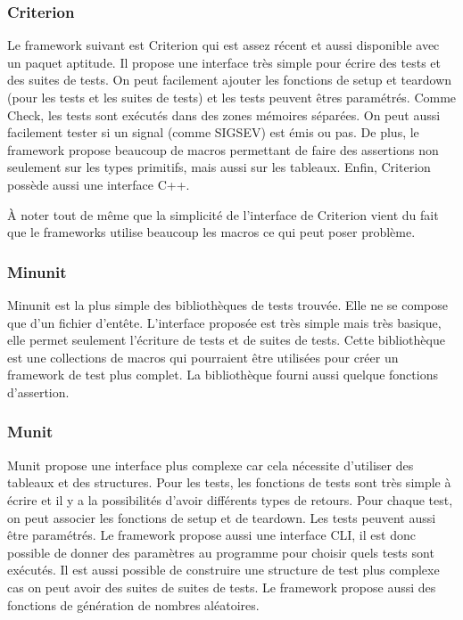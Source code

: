 \documentclass[a4paper]{article}
\begin{document}
\subsubsection*{Criterion}

Le framework suivant est Criterion qui est assez récent et aussi disponible avec
un paquet aptitude. Il propose une interface très simple pour écrire des tests
et des suites de tests. On peut facilement ajouter les fonctions de setup et
teardown (pour les tests et les suites de tests) et les tests peuvent êtres
paramétrés. Comme Check, les tests sont exécutés dans des zones mémoires
séparées. On peut aussi facilement tester si un signal (comme SIGSEV) est émis
ou pas. De plus, le framework propose beaucoup de macros permettant de faire des
assertions non seulement sur les types primitifs, mais aussi sur les tableaux.
Enfin, Criterion possède aussi une interface C++.

À noter tout de même que la simplicité de l'interface de Criterion vient du fait
que le frameworks utilise beaucoup les macros ce qui peut poser problème.

\subsubsection*{Minunit}

Minunit est la plus simple des bibliothèques de tests trouvée. Elle ne se
compose que d'un fichier d'entête. L'interface proposée est très simple mais
très basique, elle permet seulement l'écriture de tests et de suites de tests.
Cette bibliothèque est une collections de macros qui pourraient être utilisées
pour créer un framework de test plus complet. La bibliothèque fourni aussi
quelque fonctions d'assertion.

\subsubsection*{Munit}

Munit propose une interface plus complexe car cela nécessite d'utiliser des
tableaux et des structures. Pour les tests, les fonctions de tests sont très
simple à écrire et il y a la possibilités d'avoir différents types de retours.
Pour chaque test, on peut associer les fonctions de setup et de teardown. Les
tests peuvent aussi être paramétrés. Le framework propose aussi une interface
CLI, il est donc possible de donner des paramètres au programme pour choisir
quels tests sont exécutés. Il est aussi possible de construire une structure de
test plus complexe cas on peut avoir des suites de suites de tests. Le framework
propose aussi des fonctions de génération de nombres aléatoires.
\end{document}
